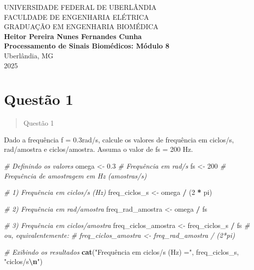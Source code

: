 \documentclass[
]{article}
\author{}
\date{\vspace{-2.5em}}
\newenvironment{Shaded}{\begin{snugshade}}{\end{snugshade}}
\newcommand{\CommentTok}[1]{\textcolor[rgb]{0.56,0.35,0.01}{\textit{#1}}}
\newcommand{\DecValTok}[1]{\textcolor[rgb]{0.00,0.00,0.81}{#1}}
\newcommand{\FloatTok}[1]{\textcolor[rgb]{0.00,0.00,0.81}{#1}}
\newcommand{\FunctionTok}[1]{\textcolor[rgb]{0.13,0.29,0.53}{\textbf{#1}}}
\newcommand{\NormalTok}[1]{#1}
\newcommand{\OtherTok}[1]{\textcolor[rgb]{0.56,0.35,0.01}{#1}}
\newcommand{\SpecialCharTok}[1]{\textcolor[rgb]{0.81,0.36,0.00}{\textbf{#1}}}
\newcommand{\StringTok}[1]{\textcolor[rgb]{0.31,0.60,0.02}{#1}}
\begin{document}
\newpage
\begin{titlepage}
\begin{center}

\large
UNIVERSIDADE FEDERAL DE UBERLÂNDIA\\
FACULDADE DE ENGENHARIA ELÉTRICA\\
GRADUAÇÃO EM ENGENHARIA BIOMÉDICA\\[7cm]

\Large
\textbf{Heitor Pereira Nunes Fernandes Cunha}\\[2cm]

\textbf{\large Processamento de Sinais Biomédicos: Módulo 8}\\[10cm]

\large
Uberlândia, MG\\
2025

\end{center}
\end{titlepage}

\newpage
\section*{Questão 1}

\begin{quote}
Questão 1
\end{quote}

Dado a frequência f = 0.3rad/s, calcule os valores de frequência em
ciclos/s, rad/amostra e ciclos/amostra. Assuma o valor de fs = 200 Hz.

\begin{Shaded}
\begin{Highlighting}[]
\CommentTok{\# Definindo os valores}
\NormalTok{omega }\OtherTok{\textless{}{-}} \FloatTok{0.3}     \CommentTok{\# Frequência em rad/s}
\NormalTok{fs }\OtherTok{\textless{}{-}} \DecValTok{200}        \CommentTok{\# Frequência de amostragem em Hz (amostras/s)}

\CommentTok{\# 1) Frequência em ciclos/s (Hz)}
\NormalTok{freq\_ciclos\_s }\OtherTok{\textless{}{-}}\NormalTok{ omega }\SpecialCharTok{/}\NormalTok{ (}\DecValTok{2} \SpecialCharTok{*}\NormalTok{ pi)}

\CommentTok{\# 2) Frequência em rad/amostra}
\NormalTok{freq\_rad\_amostra }\OtherTok{\textless{}{-}}\NormalTok{ omega }\SpecialCharTok{/}\NormalTok{ fs}

\CommentTok{\# 3) Frequência em ciclos/amostra}
\NormalTok{freq\_ciclos\_amostra }\OtherTok{\textless{}{-}}\NormalTok{ freq\_ciclos\_s }\SpecialCharTok{/}\NormalTok{ fs}
\CommentTok{\# ou, equivalentemente:}
\CommentTok{\# freq\_ciclos\_amostra \textless{}{-} freq\_rad\_amostra / (2*pi)}

\CommentTok{\# Exibindo os resultados}
\FunctionTok{cat}\NormalTok{(}\StringTok{"Frequência em ciclos/s (Hz) ="}\NormalTok{, freq\_ciclos\_s, }\StringTok{"ciclos/s}\SpecialCharTok{\textbackslash{}n}\StringTok{"}\NormalTok{)}
\end{Highlighting}
\end{Shaded}
\end{document}
